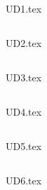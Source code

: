 \subsection{}
{UD1.tex}

\subsection{\protect{}}
{UD2.tex}

\subsection{\protect{}}
{UD3.tex}

\subsection{\protect{}}
{UD4.tex}

\subsection{\protect{}}
{UD5.tex}

\subsection{\protect{}}
{UD6.tex}